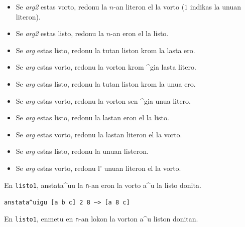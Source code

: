 \begin{itemize}
 \item Se \textit{arg2} estas vorto, redonu la $n$-an literon el la vorto ($1$ indikas la unuan literon).
 \item Se \textit{arg2} estas listo, redonu la $n$-an eron el la listo.
\end{itemize}


\begin{itemize}
\item Se \textit{arg} estas listo, redonu la tutan liston krom la lasta ero.
\item Se \textit{arg} estas vorto, redonu la vorton krom ^gia lasta litero.
\end{itemize}


\begin{itemize}
 \item Se \textit{arg} estas listo, redonu la tutan liston krom la unua ero.
 \item Se \textit{arg} estas vorto, redonu la vorton sen ^gia unua litero.
\end{itemize}


\begin{itemize}
 \item Se \textit{arg} estas listo, redonu la lastan eron el la listo.
 \item Se \textit{arg} estas vorto, redonu la lastan literon el la vorto.
\end{itemize}


\begin{itemize}
 \item Se \textit{arg} estas listo, redonu la unuan listeron.
 \item Se \textit{arg} estas vorto, redonu l' unuan literon el la vorto.
\end{itemize}


En \texttt{listo1}, anstata^uu la \texttt{n}-an eron la vorto a^u la listo donita.

\texttt{anstata^uigu [a b c] 2 8 ---> [a 8 c]}

En \texttt{listo1}, enmetu en \texttt{n}-an lokon la vorton a^u liston donitan.

